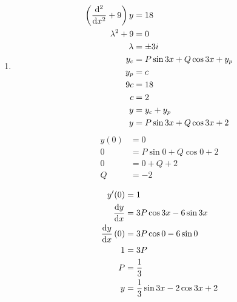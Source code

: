 \documentclass[10pt,\jkfside,a4paper]{article}
\begin{document}
\begin{enumerate}
\begin{enumerate}
\item
\begin{equation}
\begin{split}
\left(\dv[2]{x} + 9\right)y &= 18\\
\lambda^2 + 9 &= 0\\
\lambda &= \pm 3i\\
y_c &= P\sin 3x + Q \cos 3x + y_p\\
y_p &= c\\
9c &= 18\\
c &= 2\\
y &= y_c + y_p \\
y &= P\sin 3x + Q \cos 3x + 2\\
\end{split}
\end{equation}
\begin{equation}
\begin{split}
y(0) &= 0\\
0 &= P\sin 0 + Q \cos 0 + 2\\
0 &= 0 + Q + 2\\
Q &= -2\\
\end{split}
\end{equation}
\begin{equation}
\begin{split}
y'(0) &= 1 \\
\dv{y}{x} &= 3P\cos 3x - 6 \sin 3x\\
\dv{y}{x}\left(0\right) &= 3P\cos 0 - 6 \sin 0\\
1 &= 3P\\
P &= \frac{1}{3}\\
y &= \frac{1}{3}\sin 3x - 2 \cos 3x + 2\\
\end{split}
\end{equation}


\end{enumerate}
\end{enumerate}
\end{document}
